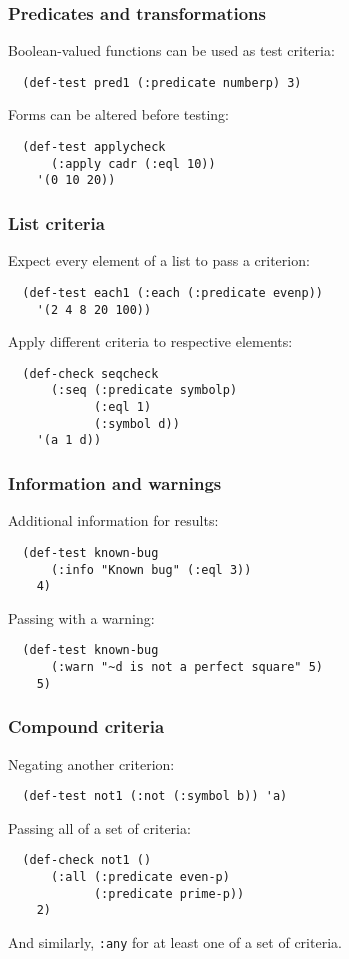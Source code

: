 \documentclass{beamer}
\begin{document}
\begin{frame}[fragile]
  \frametitle{Predicates and transformations}
Boolean-valued functions can be used as test criteria:
\begin{verbatim}
  (def-test pred1 (:predicate numberp) 3)
\end{verbatim}
Forms can be altered before testing:
\begin{verbatim}
  (def-test applycheck
      (:apply cadr (:eql 10))
    '(0 10 20))
\end{verbatim}
\end{frame}

\begin{frame}[fragile]
  \frametitle{List criteria}

  Expect every element of a list to pass a criterion:
\begin{verbatim}
  (def-test each1 (:each (:predicate evenp))
    '(2 4 8 20 100))
\end{verbatim}
  Apply different criteria to respective elements:
\begin{verbatim}
  (def-check seqcheck
      (:seq (:predicate symbolp)
            (:eql 1)
            (:symbol d))
    '(a 1 d))
\end{verbatim}
\end{frame}

\begin{frame}[fragile]
  \frametitle{Information and warnings}
  
Additional information for results:
\begin{verbatim}
  (def-test known-bug
      (:info "Known bug" (:eql 3))
    4)
\end{verbatim}
Passing with a warning:
\begin{verbatim}
  (def-test known-bug
      (:warn "~d is not a perfect square" 5)
    5)
\end{verbatim}
\end{frame}

\begin{frame}[fragile]
  \frametitle{Compound criteria}
Negating another criterion:
\begin{verbatim}
  (def-test not1 (:not (:symbol b)) 'a)
\end{verbatim}
Passing all of a set of criteria:
\begin{verbatim}
  (def-check not1 ()
      (:all (:predicate even-p)
            (:predicate prime-p))
    2)
\end{verbatim}
And similarly, \texttt{:any} for at least one of a set of criteria.
\end{frame}
\end{document}
